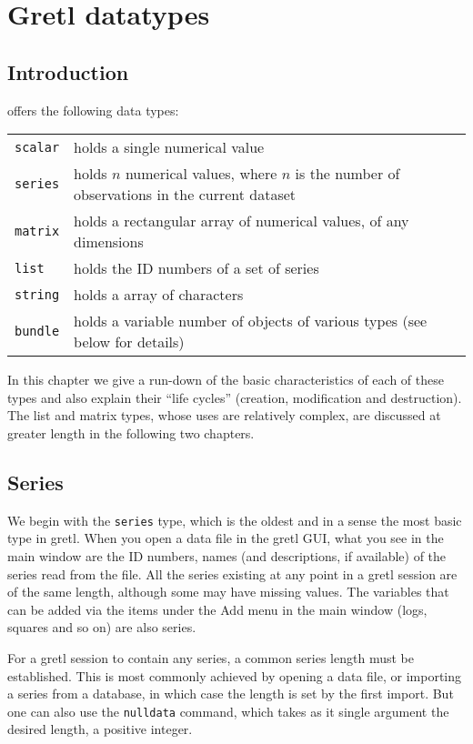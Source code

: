 \chapter{Gretl datatypes}
\label{chap:datatypes}

\section{Introduction}

 offers the following data types:
%
\begin{center}
\begin{tabular}{lp{}}
\texttt{scalar} & holds a single numerical value\\
\texttt{series} & holds $n$ numerical values, where $n$
 is the number of observations in the current dataset \\
\texttt{matrix} & holds a rectangular array of numerical
 values, of any dimensions\\
\texttt{list} & holds the ID numbers of a set of series \\
\texttt{string} & holds a array of characters\\
\texttt{bundle} & holds a variable number of objects of 
 various types (see below for details)
\end{tabular}
\end{center}

In this chapter we give a run-down of the basic characteristics of
each of these types and also explain their ``life cycles'' (creation,
modification and destruction). The list and matrix types, whose uses
are relatively complex, are discussed at greater length in the
following two chapters.

\section{Series}
\label{sec:Series}

We begin with the \texttt{series} type, which is the oldest and in a
sense the most basic type in gretl. When you open a data file in the
gretl GUI, what you see in the main window are the ID numbers, names
(and descriptions, if available) of the series read from the file. All
the series existing at any point in a gretl session are of the same
length, although some may have missing values. The variables that can
be added via the items under the \textsf{Add} menu in the main window
(logs, squares and so on) are also series.

For a gretl session to contain any series, a common series length must
be established. This is most commonly achieved by opening a data file,
or importing a series from a database, in which case the length is set
by the first import. But one can also use the \texttt{nulldata}
command, which takes as it single argument the desired length, a
positive integer.

